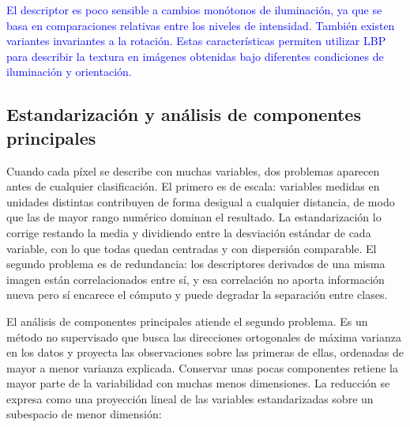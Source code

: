 \textcolor{blue}{El descriptor es poco sensible a cambios monótonos de
iluminación, ya que se basa en comparaciones relativas entre los niveles de
intensidad. También existen variantes invariantes a la rotación. Estas
características permiten utilizar LBP para describir la textura en imágenes
obtenidas bajo diferentes condiciones de iluminación y orientación.}




\subsection{Estandarización y análisis de componentes principales}

Cuando cada píxel se describe con muchas variables, dos problemas aparecen antes de cualquier clasificación. El primero es de escala: variables medidas en unidades distintas contribuyen de forma desigual a cualquier distancia, de modo que las de mayor rango numérico dominan el resultado. La estandarización lo corrige restando la media y dividiendo entre la desviación estándar de cada variable, con lo que todas quedan centradas y con dispersión comparable. El segundo problema es de redundancia: los descriptores derivados de una misma imagen están correlacionados entre sí, y esa correlación no aporta información nueva pero sí encarece el cómputo y puede degradar la separación entre clases.

El análisis de componentes principales \parencite{Jolliffe2002} atiende el segundo problema. Es un método no supervisado que busca las direcciones ortogonales de máxima varianza en los datos y proyecta las observaciones sobre las primeras de ellas, ordenadas de mayor a menor varianza explicada. Conservar unas pocas componentes retiene la mayor parte de la variabilidad con muchas menos dimensiones. La reducción se expresa como una proyección lineal de las variables estandarizadas sobre un subespacio de menor dimensión:

